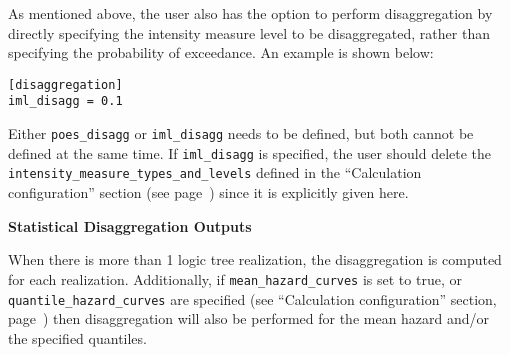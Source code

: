 As mentioned above, the user also has the option to perform disaggregation by
directly specifying the intensity measure level to be disaggregated, rather than
specifying the probability of exceedance. An example is shown below:

\begin{verbatim}
[disaggregation]
iml_disagg = 0.1
\end{verbatim}

Either \texttt{poes\_disagg} or \texttt{iml\_disagg} needs
to be defined, but both cannot be defined at the same time. If
 \texttt{iml\_disagg} is specified, the user should delete the
 \texttt{intensity\_measure\_types\_and\_levels} defined in the
``Calculation configuration'' section (see page~\pageref{sec:calculation_configuration})
since it is explicitly given here.

\textbf{Statistical Disaggregation Outputs}

 When there is more than 1 logic tree realization, the disaggregation is
 computed for each realization. Additionally, if \texttt{mean\_hazard\_curves}
 is set to true, or \texttt{quantile\_hazard\_curves} are specified (see
 ``Calculation configuration'' section, page~\pageref{sec:calculation_configuration})
 then disaggregation will also be performed for the mean hazard and/or the
 specified quantiles.